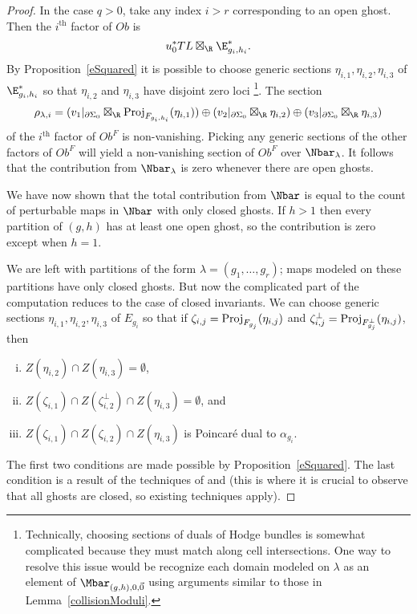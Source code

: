 \begin{proposition}
\begin{proof}
In the case $q>0$, take any index $i>r$ corresponding to an open ghost. Then the $i^{\text{th}}$ factor of $Ob$ is
\[
u_0^*TL \boxtimes_\R \E_{g_i,h_i}^*.
\]
By Proposition~\ref{eSquared} it is possible to choose generic sections $\eta_{i,1},\eta_{i,2},\eta_{i,3}$ of $\E_{g_i,h_i}^*$ so that $\eta_{i,2}$ and $\eta_{i,3}$ have disjoint zero loci \footnote{Technically, choosing sections of duals of Hodge bundles is somewhat complicated because they must match along cell intersections. One way to resolve this issue would be recognize each domain modeled on $\lambda$ as an element of $\Mbar_{(g,h),0,\vec{0}}$ using arguments similar to those in Lemma~\ref{collisionModuli}.}. The section
\[
\rho_{\lambda,i} = (v_1|_{\partial\Sigma_0} \boxtimes_\R \proj_{F_{g_i,h_i}}(\eta_{i,1})) \oplus (v_2|_{\partial\Sigma_0} \boxtimes_\R \eta_{i,2}) \oplus (v_3|_{\partial\Sigma_0} \boxtimes_\R \eta_{i,3})
\]
of the $i^{\text{th}}$ factor of $Ob^F$ is non-vanishing. Picking any generic sections of the other factors of $Ob^F$ will yield a non-vanishing section of $Ob^F$ over $\Nbar_\lambda$. It follows that the contribution from $\Nbar_\lambda$ is zero whenever there are open ghosts.

We have now shown that the total contribution from $\Nbar$ is equal to the count of perturbable maps in $\Nbar$ with only closed ghosts. If $h>1$ then every partition of $(g,h)$ has at least one open ghost, so the contribution is zero except when $h=1$.

We are left with partitions of the form $\lambda=(g_1,\ldots,g_r)$; maps modeled on these partitions have only closed ghosts. But now the complicated part of the computation reduces to the case of closed invariants. We can choose generic sections $\eta_{i,1},\eta_{i,2},\eta_{i,3}$ of $E_{g_i}$ so that if $\zeta_{i,j}=\operatorname{Proj}_{F_{g_j}}(\eta_{i,j})$ and $\zeta_{i,j}^\perp=\operatorname{Proj}_{F_{g_j}^\perp}(\eta_{i,j})$, then
\begin{enumerate}[(i)]
\item $Z(\eta_{i,2}) \cap Z(\eta_{i,3}) = \emptyset$,
\item $Z(\zeta_{i,1}) \cap Z(\zeta_{i,2}^\perp) \cap Z(\eta_{i,3}) = \emptyset$, and
\item $Z(\zeta_{i,1}) \cap Z(\zeta_{i,2}) \cap Z(\eta_{i,3})$ is Poincar\'{e} dual to $\alpha_{g_i}$.
\end{enumerate}
The first two conditions are made possible by Proposition~\ref{eSquared}. The last condition is a result of the techniques of \cite{pand} and \cite{niuZinger} (this is where it is crucial to observe that all ghosts are closed, so existing techniques apply).


\end{proof}
\end{proposition}
